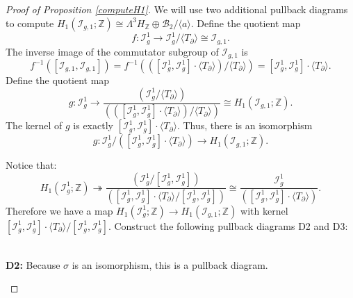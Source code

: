 \documentclass[a4paper]{amsproc}
\theoremstyle{TheoremNum}
\theoremstyle{Theorembold}
\theoremstyle{TheoremboldDef}
\theoremstyle{TheoremboldRem}
\theoremstyle{TheoremboldRem}
\begin{document}
\begin{proof}[Proof of Proposition \ref{computeH1}]
We will use two additional pullback diagrams to compute  $H_1({{\mathcal{I}}_{g,1}};{\mathbb{Z}})\cong \Lambda^3 H_{\mathbb{Z}}\oplus \mathcal{B}_2/\langle a\rangle$. Define the quotient map
\[f:{\mathcal{I}}_g^1\to {\mathcal{I}}_g^1/\langle T_\partial\rangle\cong {{\mathcal{I}}_{g,1}}.\]
 The inverse image of the commutator subgroup of ${{\mathcal{I}}_{g,1}}$ is 
\[f^{-1}([{{\mathcal{I}}_{g,1}},{{\mathcal{I}}_{g,1}}])=f^{-1}(([{{\mathcal{I}}_{g}^{1}},{{\mathcal{I}}_{g}^{1}}]\cdot\langle T_\partial\rangle)/\langle T_\partial\rangle )=[{{\mathcal{I}}_{g}^{1}},{{\mathcal{I}}_{g}^{1}}]\cdot \langle T_\partial\rangle.\]
Define the quotient map  \[g:{{\mathcal{I}}_{g}^{1}}\to \frac{({{\mathcal{I}}_{g}^{1}}/\langle T_\partial \rangle)}{(([{{\mathcal{I}}_{g}^{1}},{{\mathcal{I}}_{g}^{1}}]\cdot \langle T_\partial\rangle)/\langle T_\partial\rangle)}\cong H_1({{\mathcal{I}}_{g,1}};{\mathbb{Z}}) .\]
The kernel of $g$ is exactly $[{{\mathcal{I}}_{g}^{1}},{{\mathcal{I}}_{g}^{1}}]\cdot \langle T_\partial \rangle $. Thus, there is an isomorphism 
\[g:{{\mathcal{I}}_{g}^{1}}/([{{\mathcal{I}}_{g}^{1}},{{\mathcal{I}}_{g}^{1}}]\cdot \langle T_\partial \rangle )\to H_1({{\mathcal{I}}_{g,1}};{\mathbb{Z}}).\]
 
Notice that: \[H_1({{\mathcal{I}}_{g}^{1}};{\mathbb{Z}})\twoheadrightarrow\frac{({{\mathcal{I}}_{g}^{1}}/[{{\mathcal{I}}_{g}^{1}},{{\mathcal{I}}_{g}^{1}}])}{([{{\mathcal{I}}_{g}^{1}},{{\mathcal{I}}_{g}^{1}}]\cdot\langle T_\partial\rangle/[{{\mathcal{I}}_{g}^{1}},{{\mathcal{I}}_{g}^{1}}] )}\cong \frac{{\mathcal{I}}_{g}^{1}}{([{{\mathcal{I}}_{g}^{1}},{{\mathcal{I}}_{g}^{1}}]\cdot \langle T_\partial\rangle)}.\] Therefore we have a map  $H_1({{\mathcal{I}}_{g}^{1}};{\mathbb{Z}})\to H_1({{\mathcal{I}}_{g,1}};{\mathbb{Z}})$ with kernel $[{{\mathcal{I}}_{g}^{1}},{{\mathcal{I}}_{g}^{1}}]\cdot \langle T_\partial \rangle /[{{\mathcal{I}}_{g}^{1}},{{\mathcal{I}}_{g}^{1}}]$. Construct the following pullback diagrams D2 and D3:\\

\begin{center}
\\
\textbf{D2:} Because $\sigma$ is an isomorphism, this is a pullback diagram.\\
\end{center}


\end{proof}
\end{document}
